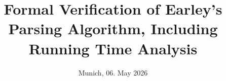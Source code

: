 
\usepackage{etoolbox}%

\newtoggle{mathprime}
\newtoggle{SF}

\let\oldisadigit\isadigit
\let\oldisacharprime\isacharprime

\renewcommand{\isaconst}[1]{{\toggletrue{SF}\toggletrue{mathprime}\textsf{#1}}}
\renewcommand{\isafree}[1]{{\toggletrue{mathprime}#1}}
\renewcommand{\isabound}[1]{{\toggletrue{mathprime}\text{#1}}}
\renewcommand{\isavar}[1]{{\toggletrue{mathprime}#1}}

\renewcommand{\isacharprime}{\iftoggle{mathprime}{\hspace{2pt}\isamath{'}}{\oldisacharprime}}
\renewcommand{\isadigit}[1]{\iftoggle{SF}{\textsf{#1}}{\oldisadigit{#1}}}



\newcommand{\noquotes}[1]{{\renewcommand{\isachardoublequote}{}\renewcommand{\isachardoublequoteopen}{}\renewcommand{\isachardoublequoteclose}{}#1}}

\newlength{\funheadersep}
\setlength{\funheadersep}{\smallskipamount}

\renewenvironment{quote}%
{\list{}{\leftmargin=0mm\rightmargin=0mm}\item[]}%
{\endlist}

\newtheorem{mytheorem}{Theorem}
\newtheorem{mylemma}{Lemma}
\newtheorem{mydefinition}{Definition}
\newtheorem{mycorollary}{Corollary}

\renewcommand{\PersonTitel}{}
\newcommand{\Datum}{\today}


\title{Formal Verification of Earley's Parsing Algorithm, Including Running Time Analysis}
\author{\PersonTitel{} \PersonVorname{} \PersonNachname}
\institute[]{\UniversitaetName \\ \FakultaetName \\ \LehrstuhlName}
\date[\Datum]{Munich, 06. May 2026}
\subject{Thema der Präsentation}




\PraesentationMasterStandard

